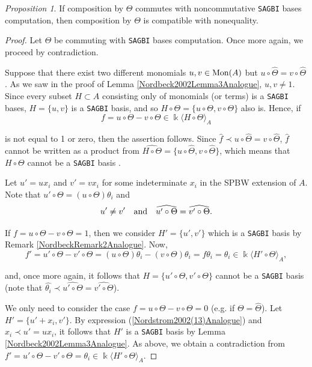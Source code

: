 \documentclass{amsart}
\theoremstyle{definition}
\theoremstyle{remark}
\newtheorem{proposition}[theorem]{Proposition}
\numberwithin{equation}{section}
\begin{document}
\begin{proposition}\label{Nordbeck2002Proposition2Analogue}
If composition by $\Theta$ commutes with noncommutative {\rm \texttt{SAGBI}} bases computation, then composition by $\Theta$ is compatible with nonequality.
\end{proposition}
\begin{proof}
Let $\Theta$ be commuting with \texttt{SAGBI} bases computation. Once more again, we proceed by contradiction. 

Suppose that there exist two different monomials $u, v \in {\rm Mon}(A)$ but $u\circ \widehat{\Theta} = v \circ \widehat{\Theta}$. As we saw in the proof of Lemma \ref{Nordbeck2002Lemma3Analogue}, $u, v \neq 1$. Since every subset $H\subset A$ consisting only of monomials (or terms) is a \texttt{SAGBI} bases, $H = \{u, v\}$ is a \texttt{SAGBI} basis, and so $H \circ \Theta = \{u\circ \Theta, v\circ \Theta\}$ also is. Hence, if 
$$
f = u\circ \Theta - v\circ \Theta \in \Bbbk\langle H \circ \Theta \rangle_{A}
$$ 

is not equal to 1 or zero, then the assertion follows. Since $\widehat{f} \prec u \circ \widehat{\Theta} = v \circ \widehat{\Theta}$, $\widehat{f}$ cannot be written as a product from $\widehat{H \circ \Theta} = \{u\circ \widehat{\Theta}, v\circ \widehat{\Theta}\}$, which means that $H\circ \Theta$ cannot be a \texttt{SAGBI} basis \cite[Remark 1]{Nordbeck2002}.

Let $u' = ux_i$ and $v' = vx_i$ for some indeterminate $x_i$ in the SPBW extension of $A$. Note that $u' \circ \Theta = (u \circ \Theta) \theta_i$ and 
\begin{equation}\label{Nordstrom2002(13)Analogue}
    u' \neq v'\quad {\rm and}\quad \widehat{u'\circ \Theta} = \widehat{v' \circ \Theta}.
\end{equation}

If $f = u\circ \Theta - v\circ \Theta = 1$, then we consider $H' = \{u', v'\}$ which is a \texttt{SAGBI} basis by Remark \ref{NordbeckRemark2Analogue}. Now,
\[
f' = u'\circ \Theta - v'\circ \Theta = (u \circ \Theta)\theta_i - (v\circ \Theta)\theta_i = f\theta_i = \theta_i \in \Bbbk\langle H' \circ \Theta \rangle_{A},
\]

and, once more again, it follows that $H = \{u' \circ \Theta, v'\circ \Theta\}$ cannot be a \texttt{SAGBI} basis (note that $\widehat{\theta_i} \prec \widehat{u'\circ \Theta} = \widehat{v' \circ \Theta}$).

We only need to consider the case $f = u\circ \Theta - v\circ \Theta = 0$ (e.g. if $\Theta = \widehat{\Theta}$). Let $H' = \{u' + x_i, v'\}$. By expression (\ref{Nordstrom2002(13)Analogue}) and $x_i \prec u' = ux_i$, it follows that $H'$ is a \texttt{SAGBI} basis by Lemma \ref{Nordbeck2002Lemma3Analogue}. As above, we obtain a contradiction from $f' = u' \circ \Theta - v' \circ \Theta = \theta_i \in \Bbbk\langle H' \circ \Theta \rangle_{A}$.
\end{proof}
\end{document}
